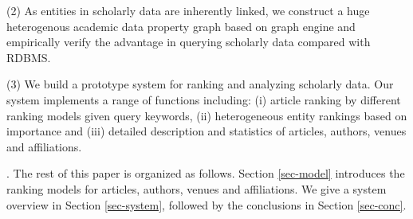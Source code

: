 \noindent (2) As entities in scholarly data are inherently linked, we construct a huge heterogenous academic data property graph based on graph engine and empirically verify the advantage in querying scholarly data compared with RDBMS.

\noindent (3) We build a prototype system for ranking and analyzing scholarly data. Our system implements a range of functions including: (i) article ranking by different ranking models given query keywords, (ii) heterogeneous entity rankings based on importance and (iii) detailed description and statistics of articles, authors, venues and affiliations.





.
The rest of this paper is organized as follows. Section \ref{sec-model} introduces the ranking models for articles, authors, venues and affiliations. We give a system overview in Section \ref{sec-system}, followed by the conclusions in Section \ref{sec-conc}.

